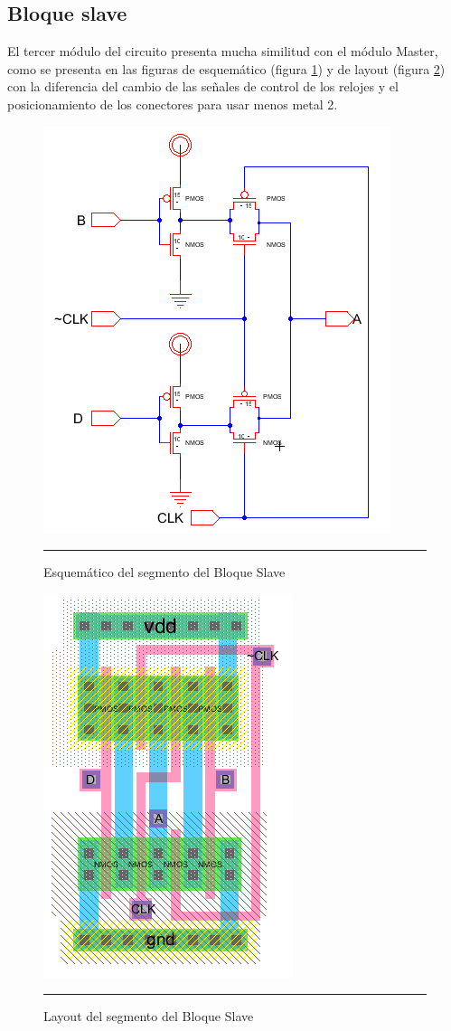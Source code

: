 \documentclass[12pt,a4paper]{article} %
\begin{document}
\subsection{Bloque slave}

El tercer módulo del circuito presenta mucha similitud con el módulo Master, como se presenta en las figuras de esquemático (figura \ref{fig:Slave_s}) y de layout (figura \ref{fig:Slave_l}) con la diferencia del cambio de las señales de control de los relojes y el posicionamiento de los conectores para usar menos metal 2.

\begin{figure}[htbp]
  \centering
    \includegraphics[scale=0.45]{./Slave_s.png}
    \rule{35em}{0.5pt}
  \caption[Slave]{Esquemático del segmento del Bloque Slave}
  \label{fig:Slave_s}
\end{figure}

\begin{figure}[htbp]
  \centering
    \includegraphics[scale=0.6]{./Slave_l.png}
    \rule{35em}{0.5pt}
  \caption[Slave]{Layout del segmento del Bloque Slave}
  \label{fig:Slave_l}
\end{figure}
\end{document}
